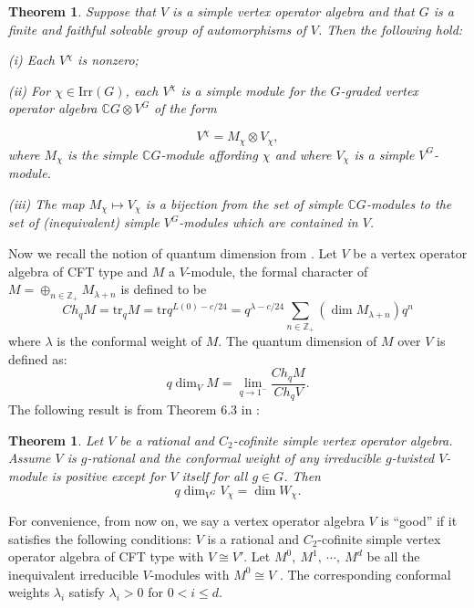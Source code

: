 \documentclass{article}
\newtheorem{theorem}[lemma]{Theorem}
\begin{document}
	\begin{theorem} \label{classical galois theory}Suppose that $V$
		is a simple vertex operator algebra and that $G$ is a finite and
		faithful solvable group of automorphisms of $V$. Then the following
		hold:
		
		(i) Each $V^{\chi}$ is nonzero;
		
		(ii) For $\chi\in\text{Irr}\left(G\right)$, each $V^{\chi}$ is a
		simple module for the $G$-graded vertex operator algebra $\mathbb{C}G\otimes V^{G}$
		of the form
		
		\[
		V^{\chi}=M_{\chi}\otimes V_{\chi},
		\]
		where $M_{\chi}$ is the simple $\mathbb{C}G$-module affording $\chi$
		and where $V_{\chi}$ is a simple $V^{G}$-module.
		
		(iii) The map $M_{\chi}\mapsto V_{\chi}$ is a bijection from the
		set of simple $\mathbb{C}G$-modules to the set of (inequivalent)
		simple $V^{G}$-modules which are contained in $V$.
		
	\end{theorem}
	
	Now we recall the notion of quantum dimension from \cite{DJX}. Let
	$V$ be a vertex operator algebra of CFT type and $M$ a $V$-module,
	the formal character of $M=\oplus_{n\in\mathbb{Z}_{+}}M_{\lambda+n}$
	is defined to be
	\[
	Ch_{q}M=\mbox{tr}_{q}M=\text{tr}q^{L(0)-c/24}=q^{\lambda-c/24}\sum_{n\in\mathbb{Z}_{+}}(\dim M_{\lambda+n})q^{n}
	\]
	where $\lambda$ is the conformal weight of $M$. The quantum dimension
	of $M$ over $V$ is defined as:
	\[
	q\dim_{V}M=\lim_{q\to1^{-}}\frac{Ch_{q}M}{Ch_{q}V}.
	\]
	The following result is from Theorem 6.3 in \cite{DJX}:
	
	\begin{theorem} \label{quantum dimension and orbifold module}Let
		$V$ be a rational and $C_{2}$-cofinite simple vertex operator algebra.
		Assume $V$ is $g$-rational and the conformal weight of any irreducible
		$g$-twisted $V$-module is positive except for $V$ itself for all
		$g\in G$. Then
		\[
		q\dim_{V^{G}}V_{\chi}=\dim W_{\chi}.
		\]
	\end{theorem}
	
	For convenience, from now on, we say a vertex operator algebra $V$
	is ``good'' if it satisfies the following conditions: $V$ is a
	rational and $C_{2}$-cofinite simple vertex operator algebra of CFT
	type with $V\cong V'$. Let $M^{0},\ M^{1},\ \cdots,\ M^{d}$ be all
	the inequivalent irreducible $V$-modules with $M^{0}\cong V$ . The
	corresponding conformal weights $\lambda_{i}$ satisfy $\lambda_{i}>0$
	for $0<i\le d$.
	
\end{document}
